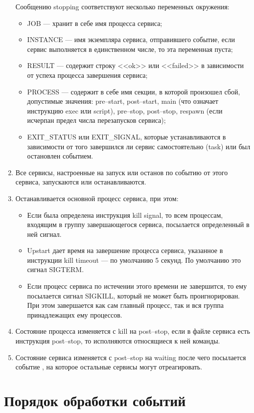 \begin{enumerate}
Сообщению stopping соответствуют несколько переменных окружения: \begin{itemize} 
\item JOB --- хранит в себе имя процесса сервиса; 
\item INSTANCE --- имя экземпляра сервиса, отправившего событие, если сервис выполняется в единственном числе, то эта переменная пуста; 
\item RESULT --- содержит строку <<ok>> или <<failed>> в зависимости от успеха процесса завершения сервиса; 
\item PROCESS --- содержит в себе имя секции, в которой произошел сбой, допустимые значения: pre--start, post--start, main (что означает инструкцию exec или script), pre--stop, post--stop, respawn (если исчерпан предел числа перезапусков сервиса); 
\item EXIT\_STATUS или EXIT\_SIGNAL, которые устанавливаются в зависимости от того завершился ли сервис самостоятельно (task) или был остановлен событием.  
\end{itemize}
\item Все сервисы, настроенные на запуск или останов по событию  от этого сервиса, запускаются или останавливаются.
\item Останавливается основной процесс сервиса, при этом: \begin{itemize}
\item Если была определена инструкция kill signal, то всем процессам, входящим в группу завершающегося сервиса, посылается определенный в ней сигнал.
\item Upstart дает время на завершение процесса сервиса, указанное в инструкции kill timeout --- по умолчанию 5 секунд. По умолчанию это сигнал SIGTERM.
\item Если процесс сервиса по истечении этого времени не завершится, то ему посылается сигнал SIGKILL, 
который не может быть проигнорирован. При этом завершается как сам главный процесс, так и вся группа принадлежащих ему процессов.
\end{itemize}
\item Состояние процесса изменяется с kill на post--stop, если в файле сервиса есть инструкция post--stop,
то исполняются относящиеся к ней команды.
\item Состояние сервиса изменяется с post--stop на waiting после чего посылается событие , на которое остальные сервисы могут отреагировать. 
\end{enumerate}
\section{Порядок обработки событий}
